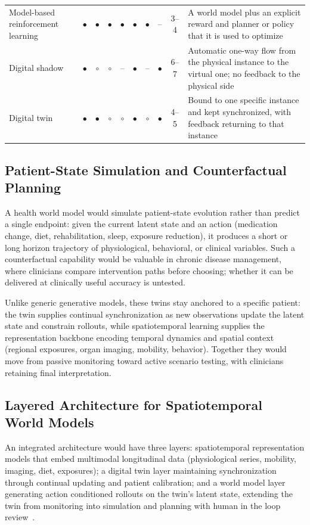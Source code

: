 \documentclass[journal]{IEEEtran}
\begin{document}
\begin{table}[t]
\begin{tabularx}{\textwidth}{>{\raggedright\arraybackslash}p{4.1cm} ccccccc c >{\raggedright\arraybackslash}X}
\addlinespace[2pt]
Model-based reinforcement learning & $\bullet$ & $\bullet$ & $\bullet$ & $\bullet$ & $\bullet$ & $\bullet$ & -- & 3--4 & A world model plus an explicit reward and planner or policy that it is used to optimize \\
\addlinespace[2pt]
Digital shadow & $\bullet$ & $\circ$ & $\circ$ & -- & $\bullet$ & -- & $\bullet$ & 6--7 & Automatic one-way flow from the physical instance to the virtual one; no feedback to the physical side \\
\addlinespace[2pt]
Digital twin & $\bullet$ & $\bullet$ & $\circ$ & $\circ$ & $\bullet$ & $\circ$ & $\bullet$ & 4--5 & Bound to one specific instance and kept synchronized, with feedback returning to that instance \\
\bottomrule
\end{tabularx}
\end{table}
\fi

\subsection{Patient-State Simulation and Counterfactual Planning}
A health world model would simulate patient-state evolution rather than predict a single endpoint: given the current latent state and an action (medication change, diet, rehabilitation, sleep, exposure reduction), it produces a short or long horizon trajectory of physiological, behavioral, or clinical variables. Such a counterfactual capability would be valuable in chronic disease management, where clinicians compare intervention paths before choosing; whether it can be delivered at clinically useful accuracy is untested.

Unlike generic generative models, these twins stay anchored to a specific patient: the twin supplies continual synchronization as new observations update the latent state and constrain rollouts, while spatiotemporal learning supplies the representation backbone encoding temporal dynamics and spatial context (regional exposures, organ imaging, mobility, behavior). Together they would move from passive monitoring toward active scenario testing, with clinicians retaining final interpretation.

\subsection{Layered Architecture for Spatiotemporal World Models}
An integrated architecture would have three layers: spatiotemporal representation models that embed multimodal longitudinal data (physiological series, mobility, imaging, diet, exposures); a digital twin layer maintaining synchronization through continual updating and patient calibration; and a world model layer generating action conditioned rollouts on the twin's latent state, extending the twin from monitoring into simulation and planning with human in the loop review~\cite{Sadee2025MedicalDT}.
\end{document}
